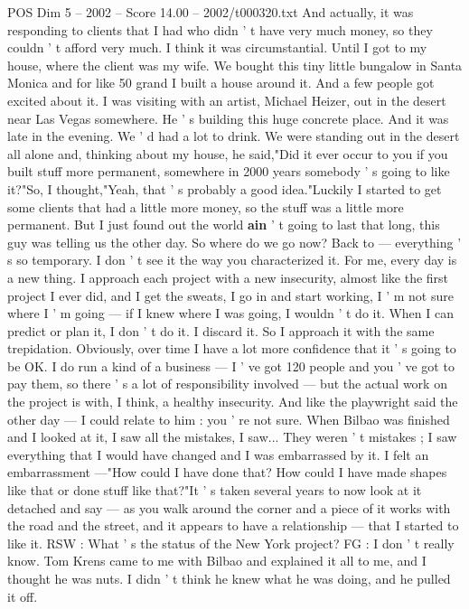 \begin{textsample}{POS Dim 5 – 2002 – Score 14.00 – 2002/t000320.txt}
And actually, it was responding to clients that I had who didn ' t have very much money, so they couldn ' t afford very much.
I think it was circumstantial.
Until I got to my house, where the client was my wife.
We bought this tiny little bungalow in Santa Monica and for like 50 grand I built a house around it.
And a few people got excited about it.
I was visiting with an artist, Michael Heizer, out in the desert near Las Vegas somewhere.
He ' s building this huge concrete place.
And it was late in the evening.
We ' d had a lot to drink.
We were standing out in the desert all alone and, thinking about my house, he said,"Did it ever occur to you if you built stuff more permanent, somewhere in 2000 years somebody ' s going to like it?"So, I thought,"Yeah, that ' s probably a good idea."Luckily I started to get some clients that had a little more money, so the stuff was a little more permanent.
But I just found out the world \textbf{ain} ' t going to last that long, this guy was telling us the other day.
So where do we go now?
Back to — everything ' s so temporary.
I don ' t see it the way you characterized it.
For me, every day is a new thing.
I approach each project with a new insecurity, almost like the first project I ever did, and I get the sweats, I go in and start working, I ' m not sure where I ' m going — if I knew where I was going, I wouldn ' t do it.
When I can predict or plan it, I don ' t do it.
I discard it.
So I approach it with the same trepidation.
Obviously, over time I have a lot more confidence that it ' s going to be OK.
I do run a kind of a business — I ' ve got 120 people and you ' ve got to pay them, so there ' s a lot of responsibility involved — but the actual work on the project is with, I think, a healthy insecurity.
And like the playwright said the other day — I could relate to him : you ' re not sure.
When Bilbao was finished and I looked at it, I saw all the mistakes, I saw...
They weren ' t mistakes ; I saw everything that I would have changed and I was embarrassed by it.
I felt an embarrassment —"How could I have done that?
How could I have made shapes like that or done stuff like that?"It ' s taken several years to now look at it detached and say — as you walk around the corner and a piece of it works with the road and the street, and it appears to have a relationship — that I started to like it.
RSW : What ' s the status of the New York project?
FG : I don ' t really know.
Tom Krens came to me with Bilbao and explained it all to me, and I thought he was nuts.
I didn ' t think he knew what he was doing, and he pulled it off.

\end{textsample}
